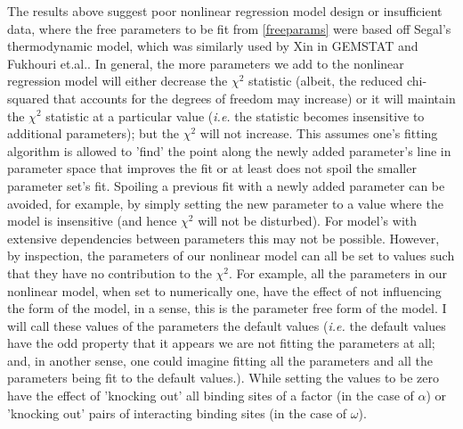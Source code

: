  The results above suggest poor nonlinear regression model design or insufficient data, where the free parameters to be fit from \ref{freeparams} were based off Segal's thermodynamic model, which was similarly used by Xin in GEMSTAT and Fukhouri et.al.\cite{pmid20087339}.  In general, the more parameters we add to the nonlinear regression model will either decrease the $\chi^2$ statistic (albeit, the reduced chi-squared that accounts for the degrees of freedom may increase) or it will maintain the $\chi^2$ statistic at a particular value (\textit{i.e.} the statistic becomes insensitive to additional parameters); but the $\chi^2$ will not increase.  This assumes one's fitting algorithm is allowed to 'find' the point along the newly added parameter's line in parameter space that improves the fit or at least does not spoil the smaller parameter set's fit.  Spoiling a previous fit with a newly added parameter can be avoided, for example, by simply setting the new parameter to a value where the model is insensitive (and hence $\chi^2$ will not be disturbed).  For model's with extensive dependencies between parameters this may not be possible.  However, by inspection, the parameters of our nonlinear model can all be set to values such that they have no contribution to the $\chi^2$.  For example, all the parameters in our nonlinear model, when set to numerically one, have the effect of not influencing the form of the model, in a sense, this is the parameter free form of the model.  I will call these values of the parameters the default values (\textit{i.e.} the default values have the odd property that it appears we are not fitting the parameters at all; and, in another sense, one could imagine fitting all the parameters and all the parameters being fit to the default values.).  While setting the values to be zero have the effect of 'knocking out' all binding sites of a factor (in the case of $\alpha$) or 'knocking out' pairs of interacting binding sites (in the case of $\omega$). 
 
